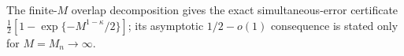 The finite-\(M\) overlap decomposition gives the exact simultaneous-error certificate \(\frac12[1-\exp\{-M^{1-\kappa}/2\}]\); its asymptotic \(1/2-o(1)\) consequence is stated only for \(M=M_n\to\infty\).